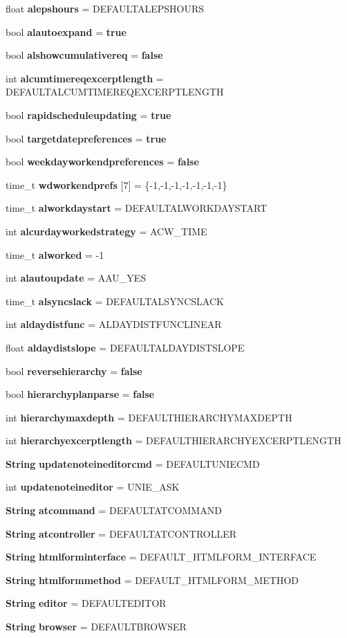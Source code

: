 \begin{CompactItemize}
float {\bf alepshours} = DEFAULTALEPSHOURS
\item 
bool {\bf alautoexpand} = {\bf true}
\item 
bool {\bf alshowcumulativereq} = {\bf false}
\item 
int {\bf alcumtimereqexcerptlength} = DEFAULTALCUMTIMEREQEXCERPTLENGTH
\item 
bool {\bf rapidscheduleupdating} = {\bf true}
\item 
bool {\bf targetdatepreferences} = {\bf true}
\item 
bool {\bf weekdayworkendpreferences} = {\bf false}
\item 
time\_\-t {\bf wdworkendprefs} [7] = \{-1,-1,-1,-1,-1,-1,-1\}
\item 
time\_\-t {\bf alworkdaystart} = DEFAULTALWORKDAYSTART
\item 
int {\bf alcurdayworkedstrategy} = ACW\_\-TIME
\item 
time\_\-t {\bf alworked} = -1
\item 
int {\bf alautoupdate} = AAU\_\-YES
\item 
time\_\-t {\bf alsyncslack} = DEFAULTALSYNCSLACK
\item 
int {\bf aldaydistfunc} = ALDAYDISTFUNCLINEAR
\item 
float {\bf aldaydistslope} = DEFAULTALDAYDISTSLOPE
\item 
bool {\bf reversehierarchy} = {\bf false}
\item 
bool {\bf hierarchyplanparse} = {\bf false}
\item 
int {\bf hierarchymaxdepth} = DEFAULTHIERARCHYMAXDEPTH
\item 
int {\bf hierarchyexcerptlength} = DEFAULTHIERARCHYEXCERPTLENGTH
\item 
{\bf String} {\bf updatenoteineditorcmd} = DEFAULTUNIECMD
\item 
int {\bf updatenoteineditor} = UNIE\_\-ASK
\item 
{\bf String} {\bf atcommand} = DEFAULTATCOMMAND
\item 
{\bf String} {\bf atcontroller} = DEFAULTATCONTROLLER
\item 
{\bf String} {\bf htmlforminterface} = DEFAULT\_\-HTMLFORM\_\-INTERFACE
\item 
{\bf String} {\bf htmlformmethod} = DEFAULT\_\-HTMLFORM\_\-METHOD
\item 
{\bf String} {\bf editor} = DEFAULTEDITOR
\item 
{\bf String} {\bf browser} = DEFAULTBROWSER
\item 

\end{CompactItemize}
